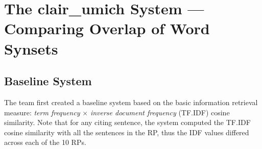\documentclass[11pt]{article}
\begin{document}
%

\section{The clair\_umich System --- Comparing Overlap of Word Synsets}
\label{s:umich}

\subsection{Baseline System}


The team first created a baseline system based on the basic
information retrieval measure: {\it term frequency} $\times$ {\it
  inverse document frequency} (TF.IDF) cosine similarity. Note that
for any citing sentence, the system computed the TF.IDF cosine
similarity with all the sentences in the RP, thus the IDF values
differed across each of the 10 RPs.
\end{document}
